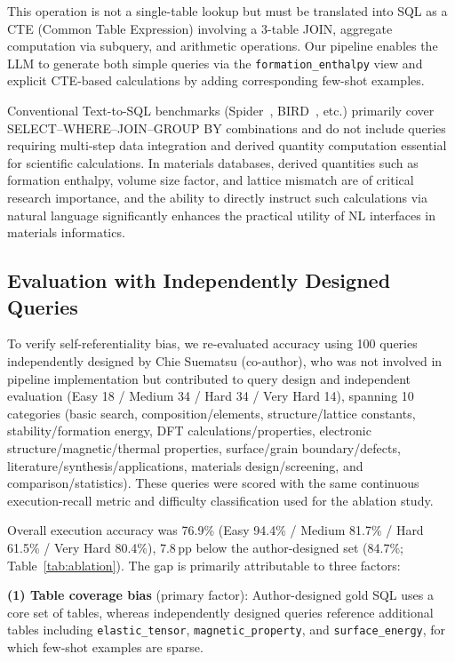 \documentclass{npj-compt.mater}
\begin{document}
This operation is not a single-table lookup but must be
translated into SQL as a CTE (Common Table Expression) involving
a 3-table JOIN, aggregate computation via subquery, and arithmetic
operations.
Our pipeline enables the LLM to generate both simple queries via
the \texttt{formation\_enthalpy} view and explicit CTE-based
calculations by adding corresponding few-shot examples.

Conventional Text-to-SQL benchmarks (Spider~\cite{yu2018spider},
BIRD~\cite{li2024bird}, etc.) primarily cover
SELECT--WHERE--JOIN--GROUP BY combinations and do not include
queries requiring multi-step data integration and derived quantity
computation essential for scientific calculations.
In materials databases,
derived quantities such as formation enthalpy, volume size factor,
and lattice mismatch are of critical research importance, and the
ability to directly instruct such calculations via natural language
significantly enhances the practical utility of NL interfaces in
materials informatics.

\subsection{Evaluation with Independently Designed Queries}
\label{sec:independent_eval}

To verify self-referentiality bias, we re-evaluated accuracy using
100 queries independently designed by Chie Suematsu (co-author),
who was not involved in pipeline implementation but contributed to
query design and independent evaluation
(Easy 18 / Medium 34 / Hard 34 / Very Hard 14), spanning 10
categories (basic search, composition/elements,
structure/lattice constants, stability/formation energy,
DFT calculations/properties, electronic structure/magnetic/thermal
properties, surface/grain boundary/defects,
literature/synthesis/applications, materials design/screening,
and comparison/statistics).
These queries were scored with the same continuous execution-recall
metric and difficulty classification used for the ablation study.

Overall execution accuracy was 76.9\%
(Easy 94.4\% / Medium 81.7\% / Hard 61.5\% / Very Hard 80.4\%),
7.8\,pp below the author-designed set (84.7\%; Table~\ref{tab:ablation}).
The gap is primarily attributable to three factors:

\textbf{(1) Table coverage bias} (primary factor):
Author-designed gold SQL uses a core set of tables, whereas
independently designed queries reference additional tables
including \texttt{elastic\_tensor}, \texttt{magnetic\_property},
and \texttt{surface\_energy}, for which few-shot examples are sparse.
\end{document}

